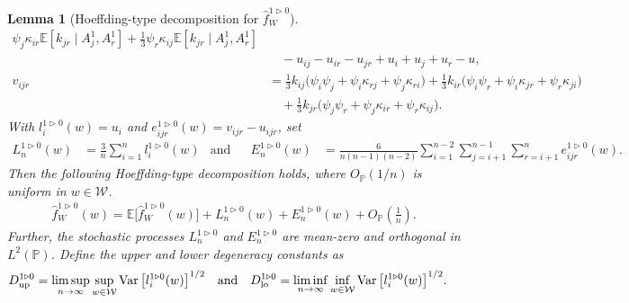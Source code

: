 \documentclass[11pt,lof]{puthesis}
\renewcommand{\P}{\ensuremath{\mathbb{P}}}
\newcommand{\E}{\ensuremath{\mathbb{E}}}
\newcommand{\cW}{\ensuremath{\mathcal{W}}}
\newcommand{\Dl}{\ensuremath{D_{\textup{lo}}}}
\newcommand{\Du}{\ensuremath{D_{\textup{up}}}}
\DeclareMathOperator{\Var}{Var}
\theoremstyle{break}
\newtheorem{lemma}{Lemma}[section]
\theoremstyle{proof}
\begin{document}
\begin{lemma}[Hoeffding-type decomposition for
  $\hat f_W^{1 \triangleright 0}$]
\begin{align*}
    \psi_j \kappa_{i r}
    \E\left[
      k_{jr}
    \mid A_j^1, A_r^1 \right]
    +
    \frac{1}{3}
    \psi_r \kappa_{i j}
    \E\left[
      k_{jr}
    \mid A_j^1, A_r^1 \right] \\
    &\quad-
    u_{i j} - u_{i r} - u_{jr}
    + u_i + u_j + u_r
    - u, \\
    v_{i j r}
    &=
    \frac{1}{3}
    k_{i j} \big(\psi_i \psi_j +\psi_i \kappa_{r j} +\psi_j \kappa_{r i} \big)
    + \frac{1}{3}
    k_{i r} \big(\psi_i \psi_r +\psi_i \kappa_{jr} +\psi_r \kappa_{j i} \big) \\
    &\quad+
    \frac{1}{3}
    k_{jr} \big(\psi_j \psi_r +\psi_j \kappa_{i r} +\psi_r \kappa_{i j} \big).
  \end{align*}
  With $l_i^{1 \triangleright 0}(w) = u_i$
  and $e_{i j r}^{1 \triangleright 0}(w) = v_{i j r} - u_{i j r}$,
  set
  \begin{align*}
    L_n^{1 \triangleright 0}(w)
    &=
    \frac{3}{n} \sum_{i=1}^n
    l_i^{1 \triangleright 0}(w)
    &\text{and} &
    &E_n^{1 \triangleright 0}(w)
    &=
    \frac{6}{n(n-1)(n-2)}
    \sum_{i=1}^{n-2}
    \sum_{j=i+1}^{n-1}
    \sum_{r=i+1}^n
    e_{i j r}^{1 \triangleright 0}(w).
  \end{align*}
  Then the following Hoeffding-type decomposition holds,
  where $O_\P(1/n)$ is uniform in $w \in \cW$.
  \begin{align*}
    \hat f_W^{1 \triangleright 0}(w)
    = \E\big[\hat f_W^{1 \triangleright 0}(w)\big]
    + L_n^{1 \triangleright 0}(w)
    + E_n^{1 \triangleright 0}(w)
    + O_\P\left( \frac{1}{n} \right).
  \end{align*}
  Further,
  the stochastic processes
  $L_n^{1 \triangleright 0}$
  and $E_n^{1 \triangleright 0}$
  are mean-zero and orthogonal
  in $L^2(\P)$.
  Define the upper and lower degeneracy constants as
  \begin{align*}
    \Du^{1 \triangleright 0}
    &=
    \limsup_{n \to \infty}
    \sup_{w \in \cW}
    \Var\big[
      l_i^{1 \triangleright 0}(w)
    \big]^{1/2}
    &\text{and}&
    &
    \Dl^{1 \triangleright 0}
    &=
    \liminf_{n \to \infty}
    \inf_{w \in \cW}
    \Var\big[
      l_i^{1 \triangleright 0}(w)
    \big]^{1/2}.
  \end{align*}

\end{lemma}
\end{document}
